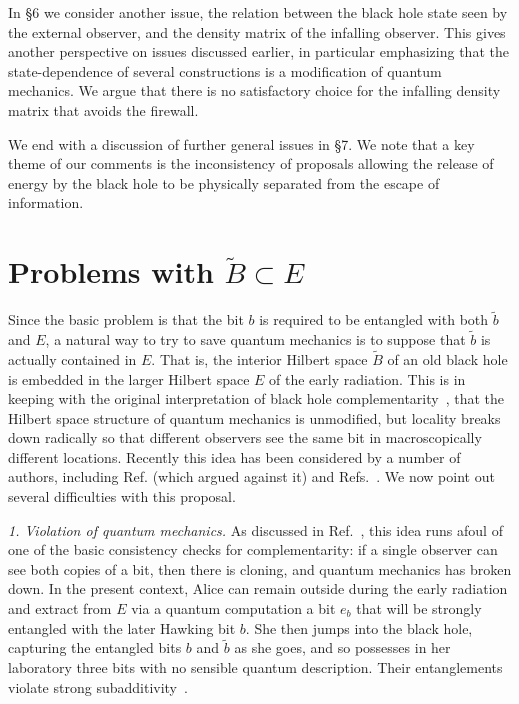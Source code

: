 \documentclass[12pt]{article}
\newcommand{\sect}[1]{\section{#1}\setcounter{equation}{0}}
\begin{document}
In \S6 we consider another issue, the relation between the black hole state seen by the external observer, and the density matrix of the infalling observer.  This gives another perspective on issues discussed earlier, in particular emphasizing that the state-dependence of several constructions is a modification of quantum mechanics.  We argue that there is no satisfactory choice for the infalling density matrix that avoids the firewall.

We end with a discussion of further general issues in \S7.  We note that a key theme of our comments is the inconsistency of proposals allowing the release of energy by the black hole to be physically separated from the escape of information.




\sect{Problems with $\tilde B \subset E$}
\label{AE}

Since the basic problem is that the bit $b$ is required to be entangled with both $\tilde b$ and $E$, a natural way to try to save quantum mechanics is to suppose
that $\tilde b$ is actually contained in $E$.  That is, the interior Hilbert space $\tilde B$ of an old black hole is embedded in the larger Hilbert space $E$ of the early radiation.  This is in keeping with the original
interpretation of black hole complementarity~\cite{Susskind:1993if,Stephens:1993an,Preskill}, that the Hilbert space structure of quantum mechanics is unmodified, but locality breaks down radically so that different observers see the same bit in macroscopically different locations.
Recently this idea has been considered by a number of authors, including {Ref. \cite{Bousso:2012as} (which argued against it) and Refs.~\cite{Srednicki,Nomura:2012sw,Nomura2,Papadodimas:2012aq,Nomura3, Harlow:2013tf,Susskind:2013tg}.   We now point out several difficulties with this proposal.}


{\it 1. Violation of quantum mechanics.} As discussed in Ref.~\cite{Almheiri:2012rt}, this idea runs afoul of one of the basic consistency checks for complementarity: if a single observer can see both copies of a bit, then there is cloning, and quantum mechanics has broken down.  In the present context, Alice can remain outside during the early radiation and extract from $E$ via a quantum computation a bit $e_b$ that will be strongly entangled with the later Hawking bit $b$.  She then jumps into the black hole, capturing the entangled bits $b$ and $\tilde b$ as she goes, and so possesses in her laboratory three bits with no sensible quantum description.  Their entanglements violate strong subadditivity~\cite{Mathur:2009hf}.
\end{document}
